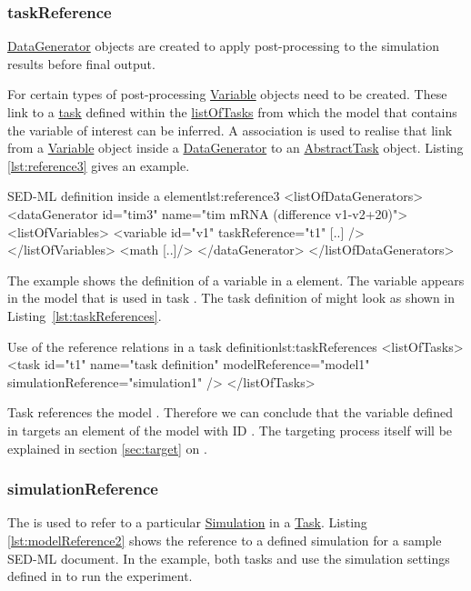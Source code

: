 \subsubsection{taskReference}
\label{sec:taskReference}
\hyperref[class:dataGenerator]{DataGenerator} objects are created to apply post-processing to the simulation results before final output. 

For certain types of post-processing \hyperref[class:variable]{Variable} objects need to be created.
These link to a \hyperref[class:abstractTask]{task} defined within the \hyperref[sec:listOfTasks]{listOfTasks} from which the model that contains the variable of interest can be inferred. A  association is used to realise that link from a \hyperref[class:variable]{Variable} object inside a \hyperref[class:dataGenerator]{DataGenerator} to an \hyperref[class:abstractTask]{AbstractTask} object. Listing \ref{lst:reference3} gives an example.

\begin{myXmlLst}{SED-ML  definition inside a  element}{lst:reference3}
<listOfDataGenerators>
	<dataGenerator id="tim3" name="tim mRNA (difference v1-v2+20)">
	<listOfVariables>
   		<variable id="v1" taskReference="t1" [..] />
  	</listOfVariables>
  	<math [..]/>
	</dataGenerator>
</listOfDataGenerators>
\end{myXmlLst}

The example shows the definition of a variable  in a  element. The variable appears in the model that is used in task . The task definition of  might look as shown in Listing~\ref{lst:taskReferences}.

\begin{myXmlLst}{Use of the reference relations in a task definition}{lst:taskReferences}
<listOfTasks>
	<task id="t1" name="task definition" modelReference="model1" simulationReference="simulation1" />
</listOfTasks>
\end{myXmlLst}
Task  references the model . Therefore we can conclude that the variable  defined in  targets an element of the model with ID . The targeting process itself will be explained in section \ref{sec:target} on .


\subsubsection{simulationReference}
\label{sec:simulationReference}
The  is used to refer to a particular \hyperref[class:simulation]{Simulation} in a \hyperref[class:task]{Task}. Listing \ref{lst:modelReference2} shows the reference to a defined simulation for a sample SED-ML document. In the example, both tasks  and  use the simulation settings defined in  to run the experiment.


